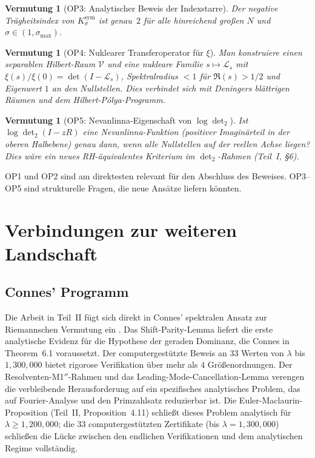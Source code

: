 \documentclass[12pt,a4paper]{article}
\newtheorem{conjecture}[theorem]{Vermutung}
\theoremstyle{definition}
\theoremstyle{remark}
\newcommand{\Ksym}{K_\sigma^{\mathrm{sym}}}
\begin{document}
\begin{conjecture}[OP3: Analytischer Beweis der Indexstarre]
\label{conj:OP3}
Der negative Trägheitsindex von $\Ksym$ ist genau~$2$ für alle hinreichend großen $N$ und $\sigma \in (1, \sigma_{\max})$.
\end{conjecture}

\begin{conjecture}[OP4: Nuklearer Transferoperator für $\xi$]
\label{conj:OP4}
Man konstruiere einen separablen Hilbert-Raum $\mathcal{V}$ und eine nukleare Familie $s \mapsto \mathcal{L}_s$ mit $\xi(s)/\xi(0) = \det(I - \mathcal{L}_s)$, Spektralradius $< 1$ für $\Re(s) > 1/2$ und Eigenwert $1$ an den Nullstellen. Dies verbindet sich mit Deningers blättrigen Räumen und dem Hilbert-P\'olya-Programm.
\end{conjecture}

\begin{conjecture}[OP5: Nevanlinna-Eigenschaft von $\log\det_2$]
\label{conj:OP5}
Ist $\log\det_2(I - zR)$ eine Nevanlinna-Funktion (positiver Imaginärteil in der oberen Halbebene) genau dann, wenn alle Nullstellen auf der reellen Achse liegen? Dies wäre ein neues RH-äquivalentes Kriterium im $\det_2$-Rahmen (Teil~I, \S6).
\end{conjecture}

\noindent OP1 und OP2 sind am direktesten relevant für den Abschluss des Beweises. OP3--OP5 sind strukturelle Fragen, die neue Ansätze liefern könnten.


\section{Verbindungen zur weiteren Landschaft}
\label{sec:connections}

\subsection{Connes' Programm}

Die Arbeit in Teil~II fügt sich direkt in Connes' spektralen Ansatz zur Riemannschen Vermutung ein \cite{Connes2025}. Das Shift-Parity-Lemma liefert die erste analytische Evidenz für die Hypothese der geraden Dominanz, die Connes in Theorem~6.1 voraussetzt. Der computergestützte Beweis an $33$ Werten von $\lambda$ bis $1{,}300{,}000$ bietet rigorose Verifikation über mehr als $4$ Größenordnungen. Der Resolventen-M1$''$-Rahmen und das Leading-Mode-Cancellation-Lemma verengen die verbleibende Herausforderung auf ein spezifisches analytisches Problem, das auf Fourier-Analyse und den Primzahlsatz reduzierbar ist. Die Euler-Maclaurin-Proposition (Teil~II, Proposition~4.11) schließt dieses Problem analytisch für $\lambda \geq 1{,}200{,}000$; die $33$ computergestützten Zertifikate (bis $\lambda = 1{,}300{,}000$) schließen die Lücke zwischen den endlichen Verifikationen und dem analytischen Regime vollständig.
\end{document}
